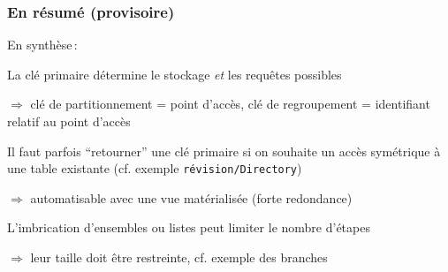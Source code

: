 	
\begin{frame}[fragile] \frametitle{En résumé (provisoire)}

En synthèse\,:

\begin{redbullet}

   \item La clé primaire détermine le stockage \emph{et} les requêtes possibles
   
     $\Rightarrow$ \alert{clé de partitionnement} = point d'accès, \alert{clé de regroupement} =
   identifiant relatif au point d'accès
  
  \item Il faut parfois ``retourner'' une clé primaire si on souhaite un accès 
     symétrique à une table existante      (cf. exemple \texttt{révision/Directory})
     
      $\Rightarrow$  automatisable avec une vue matérialisée (forte redondance)

   \item L'imbrication d'ensembles ou listes peut limiter le nombre d'étapes 
   
      $\Rightarrow$ leur taille doit être restreinte, cf. exemple des branches
   
\end{redbullet}
	
\end{frame}







